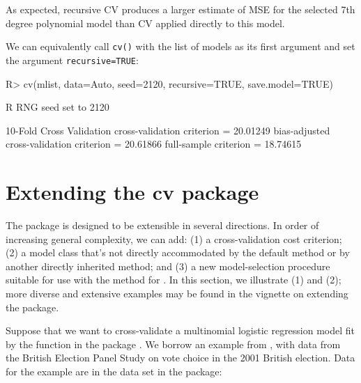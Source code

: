 \documentclass[
]{jss}
\begin{document}
As expected, recursive CV produces a larger estimate of MSE for the
selected 7th degree polynomial model than CV applied directly to this
model.

We can equivalently call \texttt{cv()} with the list of models as its
first argument and set the argument \texttt{recursive=TRUE}:

\begin{CodeChunk}
\begin{CodeInput}
R> cv(mlist, data=Auto, seed=2120, recursive=TRUE, save.model=TRUE)
\end{CodeInput}
\begin{CodeOutput}
R RNG seed set to 2120
\end{CodeOutput}
\begin{CodeOutput}
10-Fold Cross Validation
cross-validation criterion = 20.01249
bias-adjusted cross-validation criterion = 20.61866
full-sample criterion = 18.74615 
\end{CodeOutput}
\end{CodeChunk}

\section{Extending the cv package}\label{extending-the-cv-package}

The  package is designed to be extensible in several directions.
In order of increasing general complexity, we can add: (1) a
cross-validation cost criterion; (2) a model class that's not directly
accommodated by the  default method or by another directly
inherited method; and (3) a new model-selection procedure suitable for
use with the  method for . In this section,
we illustrate (1) and (2); more diverse and extensive examples may be
found in the vignette on extending the  package.

Suppose that we want to cross-validate a multinomial logistic regression
model fit by the  function in the  package
\citep{VenablesRipley:2002}. We borrow an example from \citet[Sec.
14.2.1]{Fox:2016}, with data from the British Election Panel Study on
vote choice in the 2001 British election. Data for the example are in
the  data set in the  package:
\end{document}
